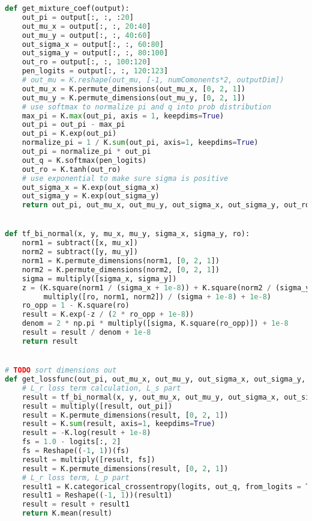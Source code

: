 \begin{lstlisting}[language = Python, frame = single, caption = {I metodi per il calcolo dell'errore di ricostruzione}, captionpos = b]
	def get_mixture_coef(output):
    out_pi = output[:, :, :20]
    out_mu_x = output[:, :, 20:40]
    out_mu_y = output[:, :, 40:60]
    out_sigma_x = output[:, :, 60:80]
    out_sigma_y = output[:, :, 80:100]
    out_ro = output[:, :, 100:120]
    pen_logits = output[:, :, 120:123]
    # out_mu = K.reshape(out_mu, [-1, numComonents*2, outputDim])
    out_mu_x = K.permute_dimensions(out_mu_x, [0, 2, 1])
    out_mu_y = K.permute_dimensions(out_mu_y, [0, 2, 1])
    # use softmax to normalize pi and q into prob distribution
    max_pi = K.max(out_pi, axis = 1, keepdims=True)
    out_pi = out_pi - max_pi
    out_pi = K.exp(out_pi)
    normalize_pi = 1 / K.sum(out_pi, axis=1, keepdims=True)
    out_pi = normalize_pi * out_pi
    out_q = K.softmax(pen_logits)
    out_ro = K.tanh(out_ro)
    # use exponential to make sure sigma is positive
    out_sigma_x = K.exp(out_sigma_x)
    out_sigma_y = K.exp(out_sigma_y)
    return out_pi, out_mu_x, out_mu_y, out_sigma_x, out_sigma_y, out_ro, out_q


def tf_bi_normal(x, y, mu_x, mu_y, sigma_x, sigma_y, ro):
    norm1 = subtract([x, mu_x])
    norm2 = subtract([y, mu_y])
    norm1 = K.permute_dimensions(norm1, [0, 2, 1])
    norm2 = K.permute_dimensions(norm2, [0, 2, 1])
    sigma = multiply([sigma_x, sigma_y])
    z = (K.square(norm1 / (sigma_x + 1e-8)) + K.square(norm2 / (sigma_y + 1e-8)) - 2 *
         multiply([ro, norm1, norm2]) / (sigma + 1e-8) + 1e-8)
    ro_opp = 1 - K.square(ro)
    result = K.exp(-z / (2 * ro_opp + 1e-8))
    denom = 2 * np.pi * multiply([sigma, K.square(ro_opp)]) + 1e-8
    result = result / denom + 1e-8
    return result


# TODO sort dimensions out
def get_lossfunc(out_pi, out_mu_x, out_mu_y, out_sigma_x, out_sigma_y, out_ro, out_q, x, y, logits):
    # L_r loss term calculation, L_s part
    result = tf_bi_normal(x, y, out_mu_x, out_mu_y, out_sigma_x, out_sigma_y, out_ro)
    result = multiply([result, out_pi])
    result = K.permute_dimensions(result, [0, 2, 1])
    result = K.sum(result, axis=1, keepdims=True)
    result = -K.log(result + 1e-8)
    fs = 1.0 - logits[:, 2]
    fs = Reshape((-1, 1))(fs)
    result = multiply([result, fs])
    result = K.permute_dimensions(result, [0, 2, 1])
    # L_r loss term, L_p part
    result1 = K.categorical_crossentropy(logits, out_q, from_logits = True)
    result1 = Reshape((-1, 1))(result1)
    result = result + result1
    return K.mean(result)
\end{lstlisting}